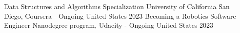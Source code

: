 
\begin{cvhonors}

  \cvhonor
    {Data Structures and Algorithms Specialization} %
    {University of California San Diego, Coursera - Ongoing} %
    {United States} %
    {2023} %
  \cvhonor
    {Becoming a Robotics Software Engineer} %
    {Nanodegree program, Udacity - Ongoing} %
    {United States} %
    {2023} %
\end{cvhonors}